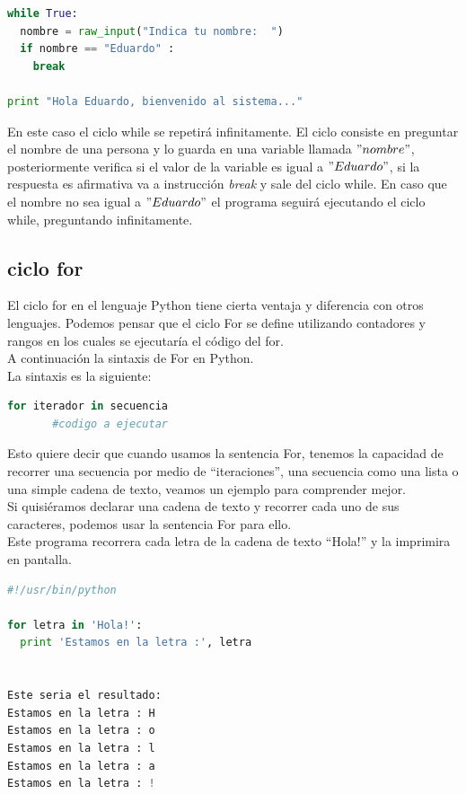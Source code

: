 \documentclass[a4paper, openright, 12pt]{article}
\begin{document}
\begin{lstlisting}[language=Python]
while True:
  nombre = raw_input("Indica tu nombre:  ")
  if nombre == "Eduardo" :
    break

print "Hola Eduardo, bienvenido al sistema..."
\end{lstlisting}

    En este caso el ciclo while se repetirá infinitamente. El ciclo consiste en preguntar el nombre de una persona y lo guarda en una variable llamada $"nombre"$, posteriormente verifica si el valor de la variable es igual a $"Eduardo"$, si la respuesta es afirmativa va a instrucción \textit{break} y sale del ciclo while. En caso que el nombre no sea igual a $"Eduardo"$ el programa seguirá ejecutando el ciclo while, preguntando infinitamente.\\


    \subsection{ciclo for}
      El ciclo for en el lenguaje Python tiene cierta ventaja y diferencia con otros lenguajes. Podemos pensar que el ciclo For se define utilizando contadores y rangos en los cuales se ejecutaría el código del for.\\

      A continuación la sintaxis de For en Python.\\

La sintaxis es la siguiente:\\
\begin{lstlisting}[language=Python]
  for iterador in secuencia
       #codigo a ejecutar
\end{lstlisting}


    Esto quiere decir que cuando usamos la sentencia For, tenemos la capacidad de recorrer una secuencia por medio de “iteraciones”, una secuencia como una lista o una simple cadena de texto, veamos un ejemplo para comprender mejor.\\

    Si quisiéramos declarar una cadena de texto y recorrer cada uno de sus caracteres, podemos usar la sentencia For para ello.\\

    Este programa recorrera cada letra de la cadena de texto “Hola!” y la imprimira en pantalla.\\

    \begin{lstlisting}[language=Python]
#!/usr/bin/python

for letra in 'Hola!':
  print 'Estamos en la letra :', letra


Este seria el resultado:
Estamos en la letra : H
Estamos en la letra : o
Estamos en la letra : l
Estamos en la letra : a
Estamos en la letra : !
    \end{lstlisting}
\end{document}
